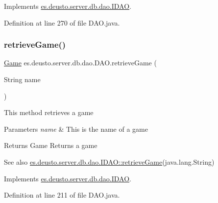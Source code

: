 Implements \hyperlink{interfacees_1_1deusto_1_1server_1_1db_1_1dao_1_1_i_d_a_o_ad6fd7873e2191e887184e2261e34e3e5}{es.\+deusto.\+server.\+db.\+dao.\+I\+D\+AO}.



Definition at line 270 of file D\+A\+O.\+java.

\mbox{\label{classes_1_1deusto_1_1server_1_1db_1_1dao_1_1_d_a_o_ac94a91d3e5aeeb98fc12f087532b3506}} 
\subsubsection{\texorpdfstring{retrieve\+Game()}{retrieveGame()}}
{\footnotesize\ttfamily \hyperlink{classes_1_1deusto_1_1server_1_1db_1_1data_1_1_game}{Game} es.\+deusto.\+server.\+db.\+dao.\+D\+A\+O.\+retrieve\+Game (\begin{DoxyParamCaption}\item[{String}]{name }\end{DoxyParamCaption})}

This method retrieves a game 
\begin{DoxyParams}{Parameters}
{\em name} & This is the name of a game \\
\hline
\end{DoxyParams}
\begin{DoxyReturn}{Returns}
Game Returns a game 
\end{DoxyReturn}
\begin{DoxySeeAlso}{See also}
\hyperlink{interfacees_1_1deusto_1_1server_1_1db_1_1dao_1_1_i_d_a_o_a30558c19c086ac0ffff6796a8ae208fb}{es.\+deusto.\+server.\+db.\+dao.\+I\+D\+A\+O\+::retrieve\+Game}(java.\+lang.\+String) 
\end{DoxySeeAlso}


Implements \hyperlink{interfacees_1_1deusto_1_1server_1_1db_1_1dao_1_1_i_d_a_o_a30558c19c086ac0ffff6796a8ae208fb}{es.\+deusto.\+server.\+db.\+dao.\+I\+D\+AO}.



Definition at line 211 of file D\+A\+O.\+java.

\mbox{\label{classes_1_1deusto_1_1server_1_1db_1_1dao_1_1_d_a_o_a16b0af798fbb00cd29a505491c57e2cd}} 
